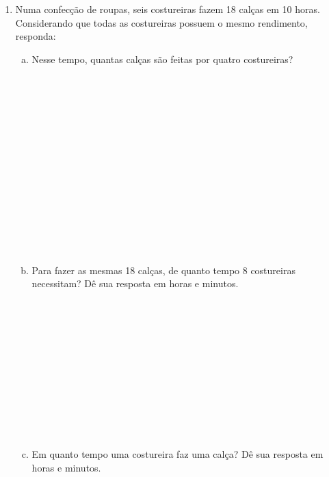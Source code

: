 \documentclass[a4paper,14pt]{article}
\begin{document}
\begin{multicols}{2}
\begin{enumerate}
    	    \item Numa confecção de roupas, seis costureiras fazem 18 calças em 10 horas. Considerando que todas as costureiras possuem o mesmo rendimento, responda:
    	    \begin{enumerate}[a)]
    	    	\item Nesse tempo, quantas calças são feitas por quatro costureiras? \\\\\\\\\\\\\\\\\\\\\\\\\\\\\\
    	    	\item Para fazer as mesmas 18 calças, de quanto tempo 8 costureiras necessitam? Dê sua resposta em horas e minutos. \\\\\\\\\\\\\\\\\\\\\\\\
    	    	\item Em quanto tempo uma costureira faz uma calça? Dê sua resposta em horas e minutos. \\\\\\\\\\\\\\\\\\\\\\\\\\\\\\
    	    \end{enumerate}

\end{enumerate}
\end{multicols}
\end{document}
